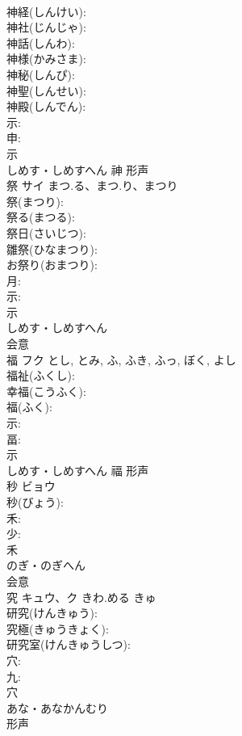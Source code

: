 \documentclass[8pt]{extreport}
\begin{document}
\begin{CJK}{UTF8}{min}
\\	神経(しんけい): 
\\	神社(じんじゃ): 
\\	神話(しんわ): 
\\	神様(かみさま): 
\\	神秘(しんぴ): 
\\	神聖(しんせい): 
\\	神殿(しんでん): 
\\	示: 
\\	申: 
\\	示	
\\	しめす・しめすへん	神	形声 
\\	祭	サイ	まつ.る、まつ.り、まつり		
\\	祭(まつり): 
\\	祭る(まつる): 
\\	祭日(さいじつ): 
\\	雛祭(ひなまつり): 
\\	お祭り(おまつり): 
\\	月: 
\\	示: 
\\	示	
\\	しめす・しめすへん	
\\	会意 
\\	福	フク		とし, とみ, ふ, ふき, ふっ, ぼく, よし	
\\	福祉(ふくし): 
\\	幸福(こうふく): 
\\	福(ふく): 
\\	示: 
\\	畐: 
\\	示	
\\	しめす・しめすへん	福	形声 
\\	秒	ビョウ			
\\	秒(びょう): 
\\	禾: 
\\	少: 
\\	禾	
\\	のぎ・のぎへん	
\\	会意 
\\	究	キュウ、ク	きわ.める	きゅ	
\\	研究(けんきゅう): 
\\	究極(きゅうきょく): 
\\	研究室(けんきゅうしつ): 
\\	穴: 
\\	九: 
\\	穴	
\\	あな・あなかんむり	
\\	形声 

\end{CJK}
\end{document}
